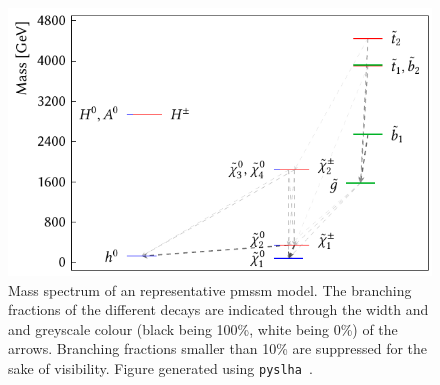 \begin{figure}
	\centering\includegraphics[width=.6\textwidth]{thesis_plot_9127}
	\caption{
Mass spectrum of an representative \gls{pmssm} model. The branching fractions of the different decays are indicated through the width and and greyscale colour (black being 100\%, white being 0\%) of the arrows. Branching fractions smaller than 10\% are suppressed for the sake of visibility. Figure generated using \texttt{pyslha}~\cite{pyslha:2013jua}.}
\label{fig:slha_example}
\end{figure}




